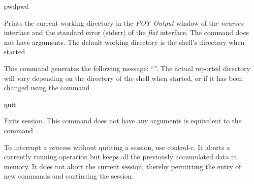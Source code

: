 
\begin{command}{pwd}{pwd}

\syntax{\obligatory{()}}

\begin{poydescription}
Prints the current working directory in the \emph{POY Output} window of
the \emph{ncurses} interface and the standard error (stderr) of the \emph{flat} interface.
The command  does not have arguments. The default
working directory is the shell's directory when \poy started.
\end{poydescription}

\begin{poyexamples}
{This command generates the following message: ``''. The actual reported
directory will vary depending on the directory of the shell when
\poy started, or if it has been changed using the command
.}
\end{poyexamples}

\begin{poyalso}
\end{poyalso}

\end{command}


\begin{command}{quit}{}

\syntax{\obligatory{()}}

\begin{poydescription}
Exits \poy session. This command does not have any arguments
 is equivalent to the command .
\end{poydescription}

\begin{statement}
To interrupt a process without quitting a \poy session, use control-c.
It aborts a currently running operation but keeps all the previously accumulated
data in memory. It does not abort the current session, thereby permitting the 
entry of new commands and continuing the session.
\end{statement}

\begin{poyexamples}
\end{poyexamples}

\begin{poyalso}
\end{poyalso}
\end{command}

